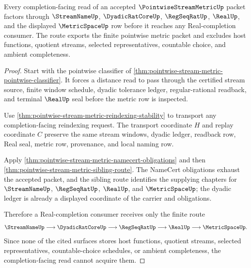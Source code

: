 \begin{theorem}
\label{thm:pointwise-stream-metric-real-completion-anchor}
Every completion-facing read of an accepted $\PointwiseStreamMetricUp$ packet factors through $\StreamNameUp$, $\DyadicRatCoreUp$, $\RegSeqRatUp$, $\RealUp$, and the displayed $\MetricSpaceUp$ row before it reaches any Real-completion consumer. The route exports the finite pointwise metric packet and excludes host functions, quotient streams, selected representatives, countable choice, and ambient completeness.
\end{theorem}
\begin{proof}
Start with the pointwise classifier of \autoref{thm:pointwise-stream-metric-pointwise-classifier}. It forces a distance read to pass through the certified stream source, finite window schedule, dyadic tolerance ledger, regular-rational readback, and terminal $\RealUp$ seal before the metric row is inspected.

Use \autoref{thm:pointwise-stream-metric-reindexing-stability} to transport any completion-facing reindexing request. The transport coordinate $H$ and replay coordinate $C$ preserve the same stream windows, dyadic ledger, readback row, Real seal, metric row, provenance, and local naming row.

Apply \autoref{thm:pointwise-stream-metric-namecert-obligations} and then \autoref{thm:pointwise-stream-metric-sibling-route}. The NameCert obligations exhaust the accepted packet, and the sibling route identifies the supplying chapters for $\StreamNameUp$, $\RegSeqRatUp$, $\RealUp$, and $\MetricSpaceUp$; the dyadic ledger is already a displayed coordinate of the carrier and obligations.

Therefore a Real-completion consumer receives only the finite route
$$
\StreamNameUp \longrightarrow \DyadicRatCoreUp \longrightarrow \RegSeqRatUp \longrightarrow \RealUp \longrightarrow \MetricSpaceUp.
$$
Since none of the cited surfaces stores host functions, quotient streams, selected representatives, countable-choice schedules, or ambient completeness, the completion-facing read cannot acquire them.
\end{proof}

